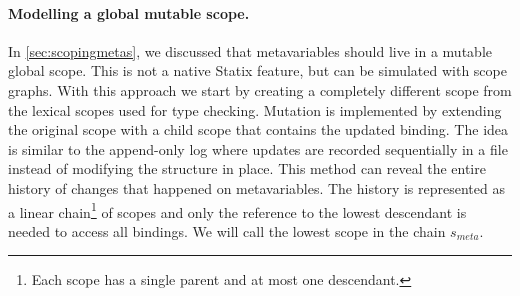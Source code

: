 \paragraph{Modelling a global mutable scope.} In \cref{sec:scopingmetas}, we discussed that metavariables should live in a mutable global scope. This is not a native Statix feature, but can be simulated with scope graphs. With this approach we start by creating a completely different scope from the lexical scopes used for type checking. Mutation is implemented by extending the original scope with a child scope that contains the updated binding. The idea is similar to the append-only log \autocite{rosenblum1992logstructured} where updates are recorded sequentially in a file instead of modifying the structure in place. This method can reveal the entire history of changes that happened on metavariables. The history is represented as a linear chain\footnote{Each scope has a single parent and at most one descendant.} of scopes and only the reference to the lowest descendant is needed to access all bindings. We will call the lowest scope in the chain $s_{meta}$.

